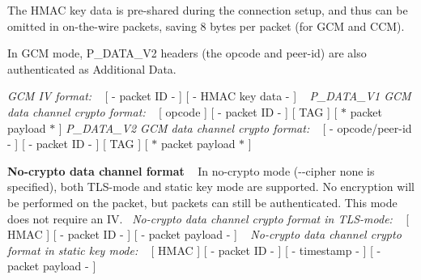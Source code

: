 \begin{DoxyParagraph}{}
The H\+M\+A\+C key data is pre-\/shared during the connection setup, and thus can be omitted in on-\/the-\/wire packets, saving 8 bytes per packet (for G\+C\+M and C\+C\+M).
\end{DoxyParagraph}
\begin{DoxyParagraph}{}
In G\+C\+M mode, P\+\_\+\+D\+A\+T\+A\+\_\+\+V2 headers (the opcode and peer-\/id) are also authenticated as Additional Data.
\end{DoxyParagraph}
\begin{DoxyParagraph}{}
{\itshape G\+C\+M I\+V format\+:} ~\newline
{\ttfamily  \mbox{[} -\/ packet I\+D -\/ \mbox{]} \mbox{[} -\/ H\+M\+A\+C key data -\/ \mbox{]} }~\newline
{\itshape P\+\_\+\+D\+A\+T\+A\+\_\+\+V1 G\+C\+M data channel crypto format\+:} ~\newline
{\ttfamily  \mbox{[} opcode \mbox{]} \mbox{[} -\/ packet I\+D -\/ \mbox{]} \mbox{[} T\+A\+G \mbox{]} \mbox{[} $\ast$ packet payload $\ast$ \mbox{]} } {\itshape P\+\_\+\+D\+A\+T\+A\+\_\+\+V2 G\+C\+M data channel crypto format\+:} ~\newline
{\ttfamily  \mbox{[} -\/ opcode/peer-\/id -\/ \mbox{]} \mbox{[} -\/ packet I\+D -\/ \mbox{]} \mbox{[} T\+A\+G \mbox{]} \mbox{[} $\ast$ packet payload $\ast$ \mbox{]} }
\end{DoxyParagraph}
\begin{DoxyParagraph}{}
{\bfseries No-\/crypto data channel format} ~\newline
In no-\/crypto mode ({\ttfamily -\/-\/cipher} {\ttfamily none} is specified), both T\+L\+S-\/mode and static key mode are supported. No encryption will be performed on the packet, but packets can still be authenticated. This mode does not require an I\+V.~\newline
{\itshape No-\/crypto data channel crypto format in T\+L\+S-\/mode\+:} ~\newline
{\ttfamily  \mbox{[} H\+M\+A\+C \mbox{]} \mbox{[} -\/ packet I\+D -\/ \mbox{]} \mbox{[} -\/ packet payload -\/ \mbox{]} } ~\newline
{\itshape No-\/crypto data channel crypto format in static key mode\+:} ~\newline
{\ttfamily  \mbox{[} H\+M\+A\+C \mbox{]} \mbox{[} -\/ packet I\+D -\/ \mbox{]} \mbox{[} -\/ timestamp -\/ \mbox{]} \mbox{[} -\/ packet payload -\/ \mbox{]} } 
\end{DoxyParagraph}


